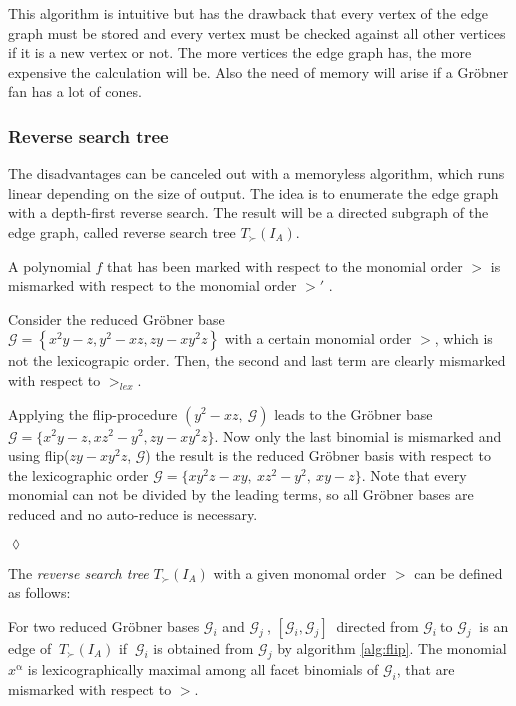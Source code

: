 This algorithm is intuitive but has the drawback that every vertex of the edge graph must be stored and every vertex must be checked against all other vertices if it is a new vertex or not. 
The more vertices the edge graph has, the more expensive the calculation will be. Also the need of memory will arise if a Gröbner fan has a lot of cones.
 
 \newpage

\subsubsection{Reverse search tree}
The disadvantages can be canceled out with a memoryless algorithm, which runs linear depending on the size of output. The idea is to enumerate the edge graph with a depth-first reverse search. The result will be a directed subgraph of the edge graph, called reverse search tree $T_{\succ}(I_{A}) $.\\
\begin{env_definition}
\cite{tigers}
A polynomial $f$ that has been marked with respect to the monomial order $>$  is mismarked with respect to the monomial order $>'$  .
\end{env_definition}

\begin{env_example}\normalfont
Consider the reduced Gröbner base \\ $\mathcal{G} = \left\lbrace x^{2}y-z,y^{2}-xz, zy-xy^{2}z \right\rbrace $ 
with a certain monomial order $>$, which is not the lexicograpic order.
Then, the second and last term are clearly mismarked with respect to $>_{lex}$.

Applying the flip-procedure $(y^{2}-xz,~\mathcal{G})$ leads to the Gröbner base \\ $\mathcal{G} = \{x^{2}y-z,xz^{2}-y^{2}, zy-xy^{2}z \} $. Now only the last binomial is mismarked and using
 flip($zy-xy^{2}z$, $\mathcal{G}$) the result is the reduced Gröbner basis with respect to the lexicographic order $\mathcal{G} = \{xy^{2}z -xy,~xz^{2}-y^{2},~xy-z \} $. Note that every monomial can not be divided by the leading terms, so all Gröbner bases are reduced and no auto-reduce is necessary.
 
\begin{flushright}
$\lozenge$
\end{flushright} 
\end{env_example}


The \textit{reverse search tree} $T_{\succ}(I_{A}) $ with a given monomal order $ > $ can be defined as follows:
\begin{env_definition}
\label{def:reverse}
\cite{tigers} For two reduced Gröbner bases $\mathcal{G}_{i}$ and $\mathcal{G}_{j}~$, $[\mathcal{G}_{i},\mathcal{G}_{j} ]~$ directed from $\mathcal{G}_{i}~$to $\mathcal{G}_{j}~$ is an edge of $~T_{\succ}(I_{A}) $ if $~\mathcal{G}_{i}$ is obtained from $\mathcal{G}_{j}$ by  algorithm \ref{alg:flip}. The monomial $x^{\upalpha}$ is lexicographically maximal among all facet binomials of $\mathcal{G}_{i}$, that are mismarked with respect to $>$.
\end{env_definition}


